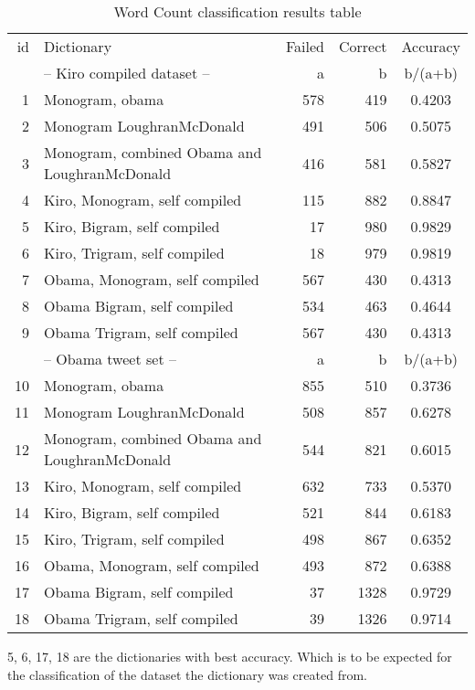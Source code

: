 \begin{table}
\centering
\label{tbl:sentiment_word_count_results}
\caption{Word Count classification results table}
\begin{tabular}{ r p{6cm} r r c }
id & Dictionary & Failed & Correct & Accuracy \\
& -- Kiro compiled dataset -- & a & b & b/(a+b) \\
\hline
1 & Monogram, obama & 578 & 419 & 0.4203 \\
2 & Monogram LoughranMcDonald & 491 & 506 & 0.5075 \\
3 & Monogram, combined Obama and LoughranMcDonald & 416 & 581 & 0.5827 \\
4 & Kiro, Monogram, self compiled & 115 & 882 & 0.8847 \\
5 & Kiro, Bigram, self compiled & 17 & 980 & 0.9829 \\
6 & Kiro, Trigram, self compiled & 18 & 979 & 0.9819 \\
7 & Obama, Monogram, self compiled & 567 & 430 & 0.4313 \\
8 & Obama Bigram, self compiled & 534 & 463 & 0.4644 \\
9 & Obama Trigram, self compiled & 567 & 430 & 0.4313 \\
& -- Obama tweet set -- & a & b & b/(a+b) \\
\hline
10 & Monogram, obama & 855 & 510 & 0.3736 \\
11 & Monogram LoughranMcDonald & 508 & 857 & 0.6278 \\
12 & Monogram, combined Obama and LoughranMcDonald & 544 & 821 & 0.6015 \\
13 & Kiro, Monogram, self compiled & 632 & 733 & 0.5370 \\
14 & Kiro, Bigram, self compiled & 521 & 844 & 0.6183 \\
15 & Kiro, Trigram, self compiled & 498 & 867 & 0.6352 \\
16 & Obama, Monogram, self compiled & 493 & 872 & 0.6388 \\
17 & Obama Bigram, self compiled & 37 & 1328 & 0.9729 \\
18 & Obama Trigram, self compiled & 39 & 1326 & 0.9714 \\
\end{tabular}
\end{table}

5, 6, 17, 18 are the dictionaries with best accuracy. Which is to be expected
for the classification of the dataset the dictionary was created from.

